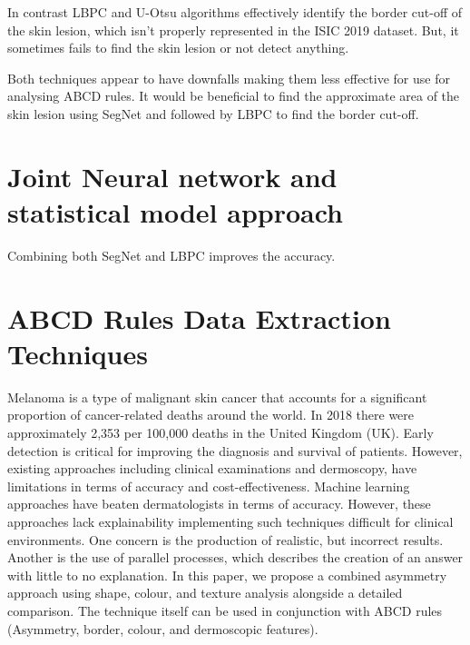 In contrast LBPC and U-Otsu algorithms effectively identify the border cut-off of the skin lesion, which isn't properly represented in the ISIC 2019 dataset. But, it sometimes fails to find the skin lesion or not detect anything. 

Both techniques appear to have downfalls making them less effective for use for analysing ABCD rules. It would be beneficial to find the approximate area of the skin lesion using SegNet and followed by LBPC to find the border cut-off.

\section{Joint Neural network and statistical model approach}
Combining both SegNet and LBPC improves the accuracy.


















\section{ABCD Rules Data Extraction Techniques}
Melanoma is a type of malignant skin cancer that accounts for a significant proportion of cancer-related deaths around the world. In 2018 there were approximately 2,353 per 100,000 deaths in the United Kingdom (UK)\cite{UK2019}. Early detection is critical for improving the diagnosis and survival of patients. However, existing approaches including clinical examinations and dermoscopy, have limitations in terms of accuracy and cost-effectiveness\cite{Takiddin2021}. Machine learning approaches have beaten dermatologists in terms of accuracy\cite{Andre2017}. However, these approaches lack explainability implementing such techniques difficult for clinical environments\cite{Fan2017}. One concern is the production of realistic, but incorrect results\cite{Ghorbani2019}. Another is the use of parallel processes, which describes the creation of an answer with little to no explanation. In this paper, we propose a combined asymmetry approach using shape, colour, and texture analysis alongside a detailed comparison. The technique itself can be used in conjunction with ABCD rules (Asymmetry, border, colour, and dermoscopic features).

